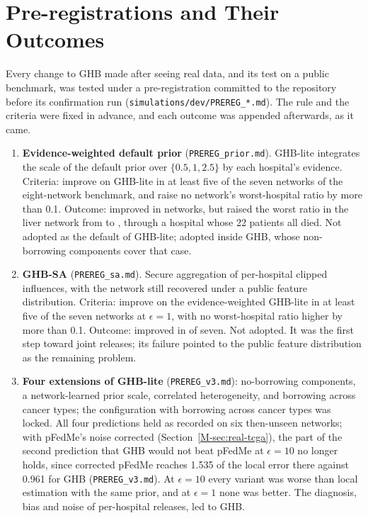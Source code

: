\documentclass[acmsmall,screen,nonacm]{acmart}
\theoremstyle{acmdefinition}
\begin{document}
\section{Pre-registrations and Their Outcomes}\label{sec:prereg}

Every change to GHB made after seeing real data, and its test on a public benchmark, was tested under a pre-registration committed to the repository before its confirmation run (\texttt{simulations/dev/PREREG\_*.md}). The rule and the criteria were fixed in advance, and each outcome was appended afterwards, as it came.

\begin{enumerate}[leftmargin=*]
\item \textbf{Evidence-weighted default prior} (\texttt{PREREG\_prior.md}). GHB-lite integrates the scale of the default prior over $\{0.5,1,2.5\}$ by each hospital's evidence. Criteria: improve on GHB-lite in at least five of the seven networks of the eight-network benchmark, and raise no network's worst-hospital ratio by more than 0.1. Outcome: improved in \SimRFOneEBvsGHBWins{} networks, but raised the worst ratio in the liver network from \SimRFOneLiverWorstGHB{} to \SimRFOneLiverWorstEB, through a hospital whose 22 patients all died. Not adopted as the default of GHB-lite; adopted inside GHB, whose non-borrowing components cover that case.
\item \textbf{GHB-SA} (\texttt{PREREG\_sa.md}). Secure aggregation of per-hospital clipped influences, with the network still recovered under a public feature distribution. Criteria: improve on the evidence-weighted GHB-lite in at least five of the seven networks at $\epsilon=1$, with no worst-hospital ratio higher by more than 0.1. Outcome: improved in \SimRFOneSAvsEBWins{} of seven. Not adopted. It was the first step toward joint releases; its failure pointed to the public feature distribution as the remaining problem.
\item \textbf{Four extensions of GHB-lite} (\texttt{PREREG\_v3.md}): no-borrowing components, a network-learned prior scale, correlated heterogeneity, and borrowing across cancer types; the configuration with borrowing across cancer types was locked. All four predictions held as recorded on six then-unseen networks; with pFedMe's noise corrected (Section~\ref{M-sec:real-tcga}), the part of the second prediction that GHB would not beat pFedMe at $\epsilon=10$ no longer holds, since corrected pFedMe reaches 1.535 of the local error there against 0.961 for GHB (\texttt{PREREG\_v3.md}). At $\epsilon=10$ every variant was worse than local estimation with the same prior, and at $\epsilon=1$ none was better. The diagnosis, bias and noise of per-hospital releases, led to GHB.

\end{enumerate}
\end{document}
